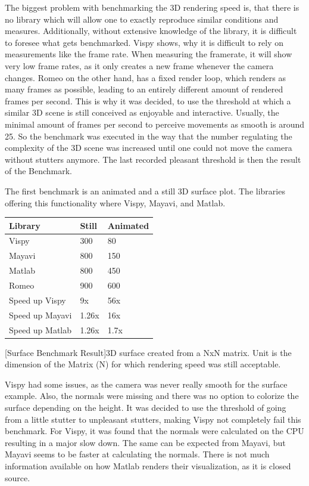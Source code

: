 The biggest problem with benchmarking the 3D rendering speed is, that there is no library which will allow one to exactly reproduce similar conditions and measures. 
Additionally, without extensive knowledge of the library, it is difficult to foresee what gets benchmarked. 
Vispy shows, why it is difficult to rely on measurements like the frame rate. 
When measuring the framerate, it will show very low frame rates, as it only creates a new frame whenever the camera changes.
Romeo on the other hand, has a fixed render loop, which renders as many frames as possible, leading to an entirely different amount of rendered frames per second. 
This is why it was decided, to use the threshold at which a similar 3D scene is still conceived as enjoyable and interactive. Usually, the minimal amount of frames per second to perceive movements as smooth is around 25.
So the benchmark was executed in the way that the number regulating the complexity of the 3D scene was increased until one could not move the camera without stutters anymore. The last recorded pleasant threshold is then the result of the Benchmark.

The first benchmark is an animated and a still 3D surface plot. The libraries offering this functionality where Vispy, Mayavi, and Matlab.

\begin{table}[htbp]
    \centering
    \begin{tabular}{l|l|l}
        \hline
        \textbf{Library} & \textbf{Still} & \textbf{Animated} \\
        \hline
        Vispy            & 300            & 80    \\
        Mayavi           & 800            & 150   \\
        Matlab           & 800            & 450   \\
        Romeo            & 900            & 600   \\
        \hline
        \hline
        Speed up Vispy   & 9x            & 56x   \\
        Speed up Mayavi  & 1.26x         & 16x   \\
        Speed up Matlab  & 1.26x         & 1.7x  \\
    \end{tabular}
    [Surface Benchmark Result]{3D surface created from a NxN matrix. Unit is the dimension of the Matrix (N) for which rendering speed was still acceptable.}
    \label{table:relativespeedoglw}
\end{table}
Vispy had some issues, as the camera was never really smooth for the surface example. Also, the normals were missing and there was no option to colorize the surface depending on the height.
It was decided to use the threshold of going from a little stutter to unpleasant stutters, making Vispy not completely fail this benchmark.
For Vispy, it was found that the normals were calculated on the CPU resulting in a major slow down\cite{VispyGithub}. The same can be expected from Mayavi, but Mayavi seems to be faster at calculating the normals.
There is not much information available on how Matlab renders their visualization, as it is closed source.

